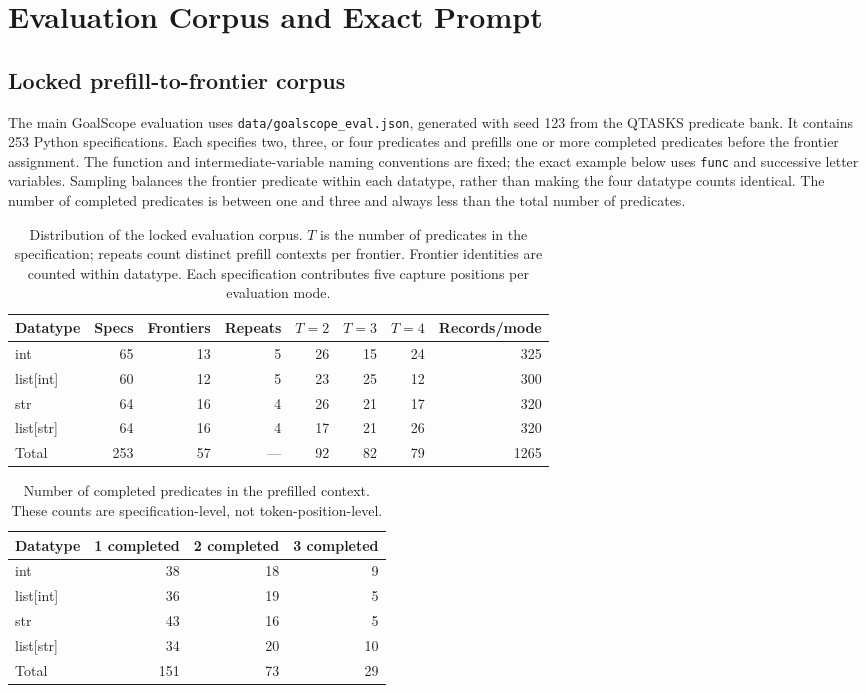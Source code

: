 \section{Evaluation Corpus and Exact Prompt}
\label{app:task}
\subsection{Locked prefill-to-frontier corpus}
The main GoalScope evaluation uses \texttt{data/goalscope\_eval.json}, generated with seed 123 from the QTASKS predicate bank. It contains 253 Python specifications. Each specifies two, three, or four predicates and prefills one or more completed predicates before the frontier assignment. The function and intermediate-variable naming conventions are fixed; the exact example below uses \texttt{func} and successive letter variables. Sampling balances the frontier predicate within each datatype, rather than making the four datatype counts identical. The number of completed predicates is between one and three and always less than the total number of predicates.

\begin{table}[ht]\centering\small
\begin{tabular}{lrrrrrrr}\toprule
Datatype & Specs & Frontiers & Repeats & $T=2$ & $T=3$ & $T=4$ & Records/mode\\\midrule
int & 65 & 13 & 5 & 26 & 15 & 24 & 325 \\
list[int] & 60 & 12 & 5 & 23 & 25 & 12 & 300 \\
str & 64 & 16 & 4 & 26 & 21 & 17 & 320 \\
list[str] & 64 & 16 & 4 & 17 & 21 & 26 & 320 \\
\midrule Total & 253 & 57 & --- & 92 & 82 & 79 & 1265\\\bottomrule
\end{tabular}
\caption{Distribution of the locked evaluation corpus. $T$ is the number of predicates in the specification; repeats count distinct prefill contexts per frontier. Frontier identities are counted within datatype. Each specification contributes five capture positions per evaluation mode.}
\label{tab:data-distribution}
\end{table}

\begin{table}[ht]\centering\small
\begin{tabular}{lrrr}\toprule
Datatype & 1 completed & 2 completed & 3 completed\\\midrule
int & 38 & 18 & 9 \\
list[int] & 36 & 19 & 5 \\
str & 43 & 16 & 5 \\
list[str] & 34 & 20 & 10 \\
\midrule Total & 151 & 73 & 29\\\bottomrule\end{tabular}
\caption{Number of completed predicates in the prefilled context. These counts are specification-level, not token-position-level.}
\end{table}


